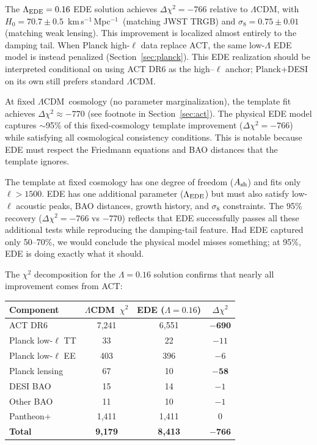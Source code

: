\documentclass[twocolumn,showpacs,preprintnumbers,amsmath,amssymb,prd]{revtex4-2}
\newcommand{\lcdm}{$\Lambda$CDM}
\newcommand{\kms}{km\,s$^{-1}$\,Mpc$^{-1}$}
\begin{document}
The $\Lambda_{\rm EDE} = 0.16$ EDE solution achieves $\Delta\chi^2 = -766$ relative to \lcdm, 
with $H_0 = 70.7 \pm 0.5$~\kms\ (matching JWST TRGB) and $\sigma_8 = 0.75 \pm 0.01$ 
(matching weak lensing). This improvement is localized almost entirely to the damping tail. When 
Planck high-$\ell$ data replace ACT, the same low-$\Lambda$ EDE model is instead 
penalized (Section~\ref{sec:planck}). This EDE realization should be interpreted 
conditional on using ACT DR6 as the high--$\ell$ anchor; Planck+DESI on its own 
still prefers standard $\Lambda$CDM.

At fixed \lcdm\ cosmology (no parameter marginalization), the template fit 
achieves $\Delta\chi^2 \approx -770$ (see footnote in Section~\ref{sec:act}). 
The physical EDE model captures $\sim$95\% of this fixed-cosmology template 
improvement ($\Delta\chi^2 = -766$) while satisfying all cosmological consistency 
conditions. This is notable because EDE must respect the Friedmann 
equations and BAO distances that the template ignores.

The template at fixed cosmology has one degree of freedom ($A_{\rm sh}$) and fits 
only $\ell > 1500$. EDE has one additional parameter ($\Lambda_{\rm EDE}$) but must 
also satisfy low-$\ell$ acoustic peaks, BAO distances, growth history, and 
$\sigma_8$ constraints. The 95\% recovery ($\Delta\chi^2 = -766$ vs $-770$) 
reflects that EDE successfully passes all these additional tests while reproducing 
the damping-tail feature. 
Had EDE captured only 50--70\%, we would conclude the physical model misses 
something; at 95\%, EDE is doing exactly what it should.

The $\chi^2$ decomposition for the $\Lambda = 0.16$ solution confirms that nearly 
all improvement comes from ACT:
\begin{center}
\begin{tabular}{lccc}
\toprule
Component & \lcdm\ $\chi^2$ & EDE ($\Lambda = 0.16$) & $\Delta\chi^2$ \\
\midrule
ACT DR6 & 7{,}241 & 6{,}551 & $\mathbf{-690}$ \\
Planck low-$\ell$ TT & 33 & 22 & $-11$ \\
Planck low-$\ell$ EE & 403 & 396 & $-6$ \\
Planck lensing & 67 & 10 & $\mathbf{-58}$ \\
DESI BAO & 15 & 14 & $-1$ \\
Other BAO & 11 & 10 & $-1$ \\
Pantheon+ & 1{,}411 & 1{,}411 & $0$ \\
\midrule
\textbf{Total} & \textbf{9{,}179} & \textbf{8{,}413} & $\mathbf{-766}$ \\
\bottomrule
\end{tabular}
\end{center}
\end{document}
